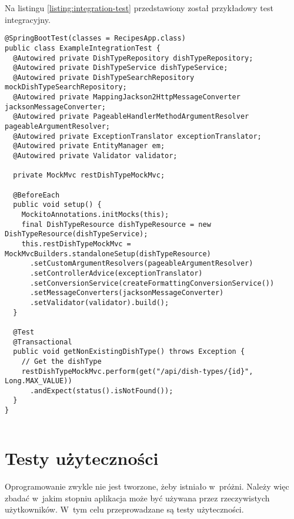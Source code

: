 \par
Na listingu \ref{listing:integration-test} przedstawiony został przykładowy test integracyjny.

\noindent\hspace{.075\textwidth}\begin{minipage}{.85\textwidth}
\begin{verbatim}
@SpringBootTest(classes = RecipesApp.class)
public class ExampleIntegrationTest {
  @Autowired private DishTypeRepository dishTypeRepository;
  @Autowired private DishTypeService dishTypeService;
  @Autowired private DishTypeSearchRepository mockDishTypeSearchRepository;
  @Autowired private MappingJackson2HttpMessageConverter jacksonMessageConverter;
  @Autowired private PageableHandlerMethodArgumentResolver pageableArgumentResolver;
  @Autowired private ExceptionTranslator exceptionTranslator;
  @Autowired private EntityManager em;
  @Autowired private Validator validator;

  private MockMvc restDishTypeMockMvc;

  @BeforeEach
  public void setup() {
    MockitoAnnotations.initMocks(this);
    final DishTypeResource dishTypeResource = new DishTypeResource(dishTypeService);
    this.restDishTypeMockMvc = MockMvcBuilders.standaloneSetup(dishTypeResource)
      .setCustomArgumentResolvers(pageableArgumentResolver)
      .setControllerAdvice(exceptionTranslator)
      .setConversionService(createFormattingConversionService())
      .setMessageConverters(jacksonMessageConverter)
      .setValidator(validator).build();
  }

  @Test
  @Transactional
  public void getNonExistingDishType() throws Exception {
    // Get the dishType
    restDishTypeMockMvc.perform(get("/api/dish-types/{id}", Long.MAX_VALUE))
      .andExpect(status().isNotFound());
  }
}
\end{verbatim}
\begin{lstlisting}[caption={Przykładowy test integracyjny \source{\ownwork}}, label={listing:integration-test}]
\end{lstlisting}
\end{minipage}

\section{Testy użyteczności}

Oprogramowanie zwykle nie jest tworzone, żeby istniało w~próżni.
Należy więc zbadać w~jakim stopniu aplikacja może być używana przez rzeczywistych użytkowników.
W~tym celu przeprowadzane są testy użyteczności\cite{book:testowanie-i-jakosc-oprogramowania}.

